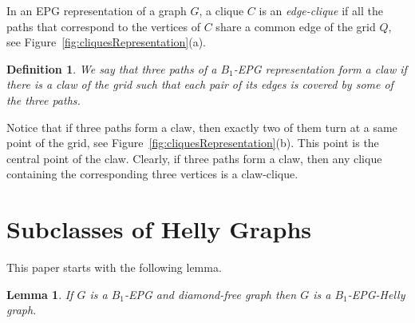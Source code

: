 \documentclass[9pt]{entcs}
\newtheorem{lema}{Lemma}[section]
\newtheorem{defi}{Definition}[section]
\begin{document}


In an EPG representation of a graph $G$, a clique $C$  is an \textit{edge-clique} if all the paths that correspond to the vertices of $C$ share a common edge of the grid $Q$, see Figure~\ref{fig:cliquesRepresentation}(a). %

\begin{defi}
  We say that three paths of a $B_1$-EPG representation form a claw if there is a claw
of the grid such that each pair of its edges is covered by some of the three paths.
\end{defi}

Notice that if three paths form a claw, then exactly two of them turn at a same
point of the grid,  see Figure~\ref{fig:cliquesRepresentation}(b). This point is the central point of the claw. Clearly, if three paths form a claw, then any clique containing the corresponding three vertices
is a claw-clique.






\section{Subclasses of Helly Graphs}

This paper starts with the following lemma.


\begin{lema} \label{lem:b1DiamondFree}
 If $G$ is a $B_1$-EPG and diamond-free graph then $G$ is a $B_1$-EPG-Helly graph.
 \end{lema}
\end{document}
